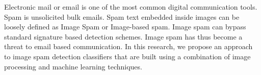 \par Electronic mail or email is one of the most common digital communication tools.  Spam is unsolicited bulk emails. Spam text embedded inside images can be loosely defined as Image Spam or Image-based spam. Image spam can bypass standard signature based detection schemes. Image spam has thus become a threat to email based communication. In this research, we propose an approach to image spam detection classifiers that are built using a combination of image processing and machine learning techniques. 


